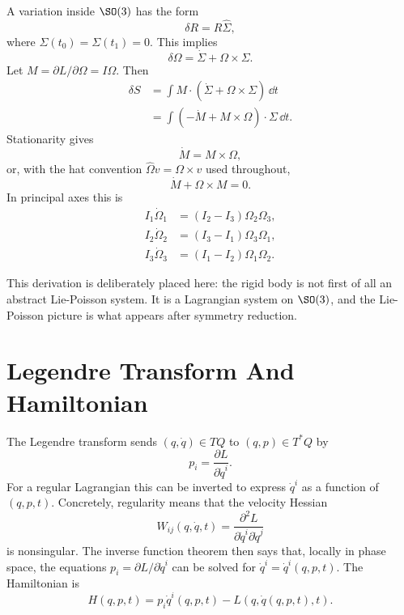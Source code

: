 \begin{derivation}
A variation inside \(\SO(3)\) has the form
\[
  \delta R=R\widehat\Sigma,
\]
where \(\Sigma(t_0)=\Sigma(t_1)=0\). This implies
\[
  \delta\Omega=\dot\Sigma+\Omega\times\Sigma.
\]
Let \(M=\partial L/\partial\Omega=I\Omega\). Then
\[
\begin{aligned}
  \delta S
  &=
  \int M\cdot(\dot\Sigma+\Omega\times\Sigma)\,\dd t\\
  &=
  \int(-\dot M+M\times\Omega)\cdot\Sigma\,\dd t.
\end{aligned}
\]
Stationarity gives
\[
  \dot M=M\times\Omega,
\]
or, with the hat convention \(\widehat\Omega v=\Omega\times v\) used
throughout,
\[
  \dot M+\Omega\times M=0.
\]
In principal axes this is
\[
\begin{aligned}
  I_1\dot\Omega_1 &= (I_2-I_3)\Omega_2\Omega_3,\\
  I_2\dot\Omega_2 &= (I_3-I_1)\Omega_3\Omega_1,\\
  I_3\dot\Omega_3 &= (I_1-I_2)\Omega_1\Omega_2.
\end{aligned}
\]
\end{derivation}

This derivation is deliberately placed here: the rigid body is not first of all
an abstract Lie-Poisson system. It is a Lagrangian system on \(\SO(3)\), and the
Lie-Poisson picture is what appears after symmetry reduction.

\section{Legendre Transform And Hamiltonian}
\label{sec:legendre-hamiltonian}

The Legendre transform sends \((q,\dot q)\in TQ\) to \((q,p)\in T^*Q\) by
\[
  p_i=\frac{\partial L}{\partial \dot q^i}.
\]
For a regular Lagrangian this can be inverted to express \(\dot q^i\) as a
function of \((q,p,t)\). Concretely, regularity means that the velocity Hessian
\[
  W_{ij}(q,\dot q,t)=
  \frac{\partial^2L}{\partial\dot q^i\partial\dot q^j}
\]
is nonsingular. The inverse function theorem then says that, locally in phase
space, the equations \(p_i=\partial L/\partial\dot q^i\) can be solved for
\(\dot q^i=\dot q^i(q,p,t)\).
The Hamiltonian is
\[
  H(q,p,t)=p_i\dot q^i(q,p,t)-L(q,\dot q(q,p,t),t).
\]

